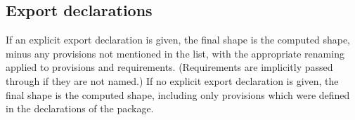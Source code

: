 \documentclass{article}
\newcommand{\Red}[1]{{\color{red} #1}}
\begin{document}





%
%
%


\subsection{Export declarations}

If an explicit export declaration is given, the final shape is the
computed shape, minus any provisions not mentioned in the list, with the
appropriate renaming applied to provisions and requirements.  (Requirements
are implicitly passed through if they are not named.)
If no explicit export declaration is given, the final shape is
the computed shape, including only provisions which were defined
in the declarations of the package.
\end{document}
